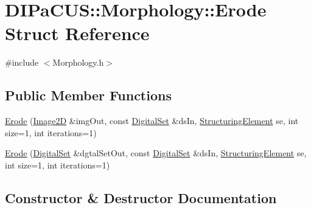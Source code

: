 \hypertarget{structDIPaCUS_1_1Morphology_1_1Erode}{}\section{D\+I\+Pa\+C\+US\+:\+:Morphology\+:\+:Erode Struct Reference}
\label{structDIPaCUS_1_1Morphology_1_1Erode}


{\ttfamily \#include $<$Morphology.\+h$>$}

\subsection*{Public Member Functions}
\begin{DoxyCompactItemize}
\item 
\mbox{\hyperlink{structDIPaCUS_1_1Morphology_1_1Erode_a87e6486ef6ddcd67a4cb817c9b71da1f}{Erode}} (\mbox{\hyperlink{namespaceDIPaCUS_1_1Morphology_a9aff9edf28d681accfc54435fbefcbee}{Image2D}} \&img\+Out, const \mbox{\hyperlink{namespaceDIPaCUS_1_1Morphology_ab69fa725716b0ed4c311c0d00a292be7}{Digital\+Set}} \&ds\+In, \mbox{\hyperlink{namespaceDIPaCUS_1_1Morphology_a60b552d68432e7992f09717070d9c4e7}{Structuring\+Element}} se, int size=1, int iterations=1)
\item 
\mbox{\hyperlink{structDIPaCUS_1_1Morphology_1_1Erode_a187a3befe8428a76a503a70a20a40f07}{Erode}} (\mbox{\hyperlink{namespaceDIPaCUS_1_1Morphology_ab69fa725716b0ed4c311c0d00a292be7}{Digital\+Set}} \&dgtal\+Set\+Out, const \mbox{\hyperlink{namespaceDIPaCUS_1_1Morphology_ab69fa725716b0ed4c311c0d00a292be7}{Digital\+Set}} \&ds\+In, \mbox{\hyperlink{namespaceDIPaCUS_1_1Morphology_a60b552d68432e7992f09717070d9c4e7}{Structuring\+Element}} se, int size=1, int iterations=1)
\end{DoxyCompactItemize}


\subsection{Constructor \& Destructor Documentation}
\mbox{\label{structDIPaCUS_1_1Morphology_1_1Erode_a87e6486ef6ddcd67a4cb817c9b71da1f}} 
